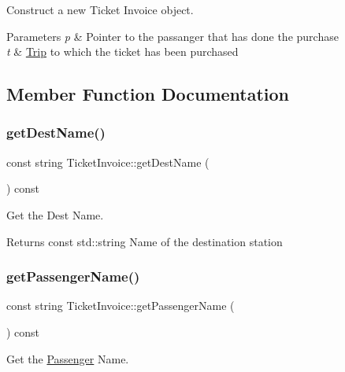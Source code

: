 Construct a new Ticket Invoice object. 


\begin{DoxyParams}{Parameters}
{\em p} & Pointer to the passanger that has done the purchase \\
\hline
{\em t} & \mbox{\hyperlink{classTrip}{Trip}} to which the ticket has been purchased \\
\hline
\end{DoxyParams}


\subsection{Member Function Documentation}
\mbox{\label{classTicketInvoice_a1db4ffac81e11b765c6204278a3df8ff}} 
\subsubsection{\texorpdfstring{get\+Dest\+Name()}{getDestName()}}
{\footnotesize\ttfamily const string Ticket\+Invoice\+::get\+Dest\+Name (\begin{DoxyParamCaption}{ }\end{DoxyParamCaption}) const}



Get the Dest Name. 

\begin{DoxyReturn}{Returns}
const std\+::string Name of the destination station 
\end{DoxyReturn}
\mbox{\label{classTicketInvoice_a9fdfdcd08ff90480ca85e027f57033e4}} 
\subsubsection{\texorpdfstring{get\+Passenger\+Name()}{getPassengerName()}}
{\footnotesize\ttfamily const string Ticket\+Invoice\+::get\+Passenger\+Name (\begin{DoxyParamCaption}{ }\end{DoxyParamCaption}) const}



Get the \mbox{\hyperlink{classPassenger}{Passenger}} Name. 

